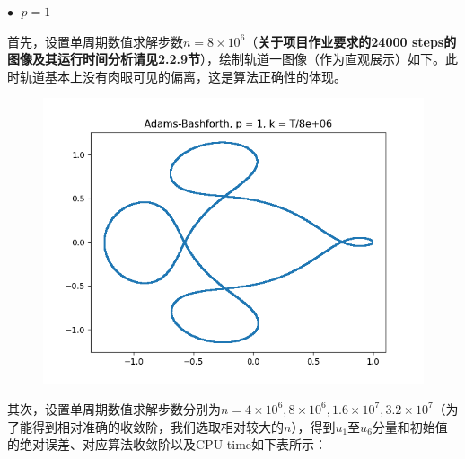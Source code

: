 \documentclass{ctexart}
\begin{document}
\begin{sloppypar}
$\bullet \;$ $p = 1$

首先，设置单周期数值求解步数$n = 8 \times 10^6$（\textbf{关于项目作业要求的24000 steps的图像及其运行时间分析请见2.2.9节}），绘制轨道一图像（作为直观展示）如下。此时轨道基本上没有肉眼可见的偏离，这是算法正确性的体现。
\begin{figure}[H]
\centering
\includegraphics[scale = 0.45]{./report_src/Figure_1.png}
\end{figure}
其次，设置单周期数值求解步数分别为$n = 4 \times 10^6,8 \times 10^6,1.6 \times 10^7, 3.2 \times 10^7$（为了能得到相对准确的收敛阶，我们选取相对较大的$n$），得到$u_1$至$u_6$分量和初始值的绝对误差、对应算法收敛阶以及CPU time如下表所示：


\end{sloppypar}
\end{document}
